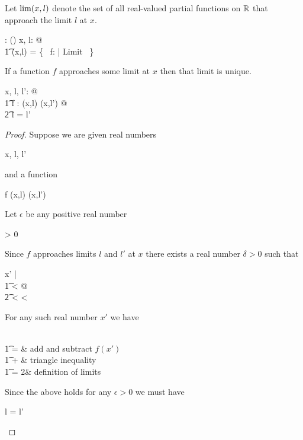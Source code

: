 \documentclass[11pt, oneside]{article}
\begin{document}
Let $\operatorname{lim}(x,l)$ denote the set of all real-valued partial functions on $\mathbb{R}$ that approach the limit $l$ at $x$.

\begin{axdef}
	\limRR: \R \cross \R \fun \power(\R \pfun \R)
\where
	\forall x, l: \R @ \\
	\t1	\limRR(x,l) = \{~ f: \R \pfun \R | Limit ~\}
\end{axdef}

\begin{theorem}
If a function $f$ approaches some limit at $x$ then that limit is unique.
\begin{zed}
	\forall x, l, l': \R @ \\
	\t1	\forall f : \limRR(x,l) \cap \limRR(x,l') @ \\
	\t2		l = l'
\end{zed}
\end{theorem}

\begin{proof}
Suppose we are given real numbers
\begin{argue}
	x, l, l' \in \R 
\end{argue}
and a function
\begin{argue}
	f \in \limRR(x,l) \cap \limRR(x,l')
\end{argue}
Let $\epsilon$ be any positive real number
\begin{argue}
	\epsilon > 0
\end{argue}
Since $f$ approaches limits $l$ and $l'$ at $x$ there exists a real number $\delta > 0$ such that
\begin{argue}
	\forall x' \in \R |  \\
	\t1	\zeroR \ltR {}< \delta @ \\
	\t2		  < \epsilon \land {} < \epsilon
\end{argue}
For any such real number $x'$ we have
\begin{argue}
	 \\
	\t1	=  			& add and subtract $f(x')$ \\
	\t1	\leq {} +  	& triangle inequality \\
	\t1	= 2\epsilon					& definition of limits
\end{argue}
Since the above holds for any $\epsilon > 0$ we must have
\begin{argue}
	l = l'
\end{argue}

\end{proof}
\end{document}
